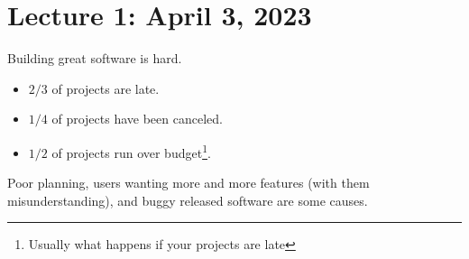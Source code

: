 \documentclass[letterpaper]{article}
\begin{document}
\section{Lecture 1: April 3, 2023}
Building great software is hard. 
\begin{itemize}
    \item $2/3$ of projects are late. 
    \item $1/4$ of projects have been canceled.
    \item $1/2$ of projects run over budget\footnote{Usually what happens if your projects are late}.
\end{itemize} 
Poor planning, users wanting more and more features (with them misunderstanding), and buggy released software are some causes. 
\end{document}
